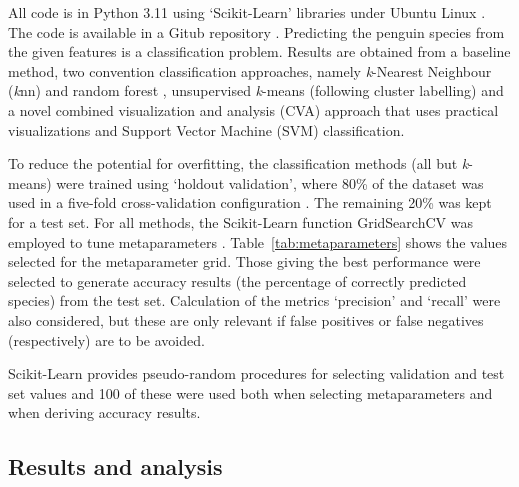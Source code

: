 \documentclass[12pt]{article}
\begin{document}
All code is in Python 3.11 \cite{python311} using ‘Scikit-Learn’ libraries \cite{scikit-learn} 
under Ubuntu Linux \cite{ubuntu}. The code is available in a Gitub repository \cite{TimAIRepo}. 
Predicting the penguin species from the given features is a classification problem. 
Results are obtained from a baseline method, two convention classification approaches, 
namely \textit{k}-Nearest Neighbour (\textit{k}nn) \cite{bishop2006pattern} and random forest \cite{breiman2001random}, 
unsupervised \textit{k}-means (following cluster labelling) \cite{tan2005introduction} 
and a novel combined visualization and analysis (CVA) approach that uses 
practical visualizations and Support Vector Machine (SVM) classification.

To reduce the potential for overfitting, the classification methods (all but \textit{k}-means) were trained using 
`holdout validation', where 80\% of the dataset was used in a five-fold cross-validation 
configuration \cite{james2013introduction}. The remaining 20\% was kept for a test set. For all methods, 
the Scikit-Learn function GridSearchCV was employed to tune metaparameters \cite{scikit-learn}. 
Table~\ref{tab:metaparameters} shows the values selected for the metaparameter grid. Those giving the best 
performance were selected to generate accuracy results (the percentage of correctly predicted species) 
from the test set. Calculation of the metrics `precision' and `recall' were also considered, 
but these are only relevant if false positives or false negatives (respectively) are to be avoided.   

Scikit-Learn provides pseudo-random procedures for selecting validation and test set values and 100 of these were used 
both when selecting metaparameters and when deriving accuracy results.

\subsection*{Results and analysis}
\end{document}
